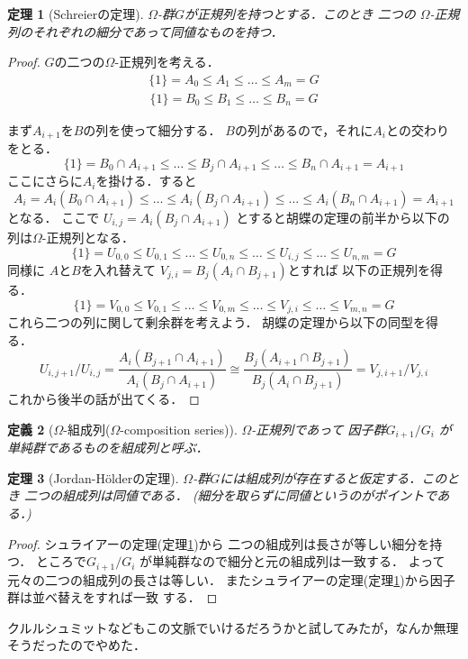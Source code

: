 \documentclass[leqno]{jsarticle}
\newtheorem{thm}{定理}
\newtheorem{df}[thm]{定義}
\begin{document}
\begin{thm}[Schreierの定理]\label{thm:sch}
$\Omega$-群$G$が正規列を持つとする．このとき
二つの
$\Omega$-正規列のそれぞれの細分であって同値なものを持つ．
\end{thm}
\begin{proof}
$G$の二つの$\Omega$-正規列を考える．
\begin{align}\label{al:aseries}
\{1\}=A_{0}\le A_{1}\le \dots \le A_{m}=G
\end{align}
\begin{align}\label{al:bseries}
\{1\}=B_{0}\le B_{1}\le \dots \le B_{n}=G
\end{align}

まず$A_{i+1}$を$B$の列を使って細分する．
$B$の列があるので，それに$A_{i}$との交わりをとる．
\[
\{1\}=B_{0}\cap A_{i+1}\le \dots \le B_{j}\cap A_{i+1}\le \dots \le B_{n}\cap A_{i+1}=A_{i+1}
\]
ここにさらに$A_{i}$を掛ける．すると
\[
A_{i}=A_{i}(B_{0}\cap A_{i+1})\le \dots \le
A_{i}( B_{j}\cap A_{i+1})
\le \dots \le
A_{i}(B_{n}\cap A_{i+1})=A_{i+1}
\]
となる．
ここで
$U_{i, j}=A_{i}(B_{j}\cap A_{i+1})$
とすると胡蝶の定理の前半から以下の列は$\Omega$-正規列となる．
\[
\{1\}=U_{0, 0}\le U_{0, 1}\le \dots\le U_{0, n}\le \dots
\le U_{i, j}\le \dots \le U_{n, m}=G
\]
同様に
$A$と$B$を入れ替えて
$V_{j, i}=B_{j}(A_{i}\cap B_{j+1})$とすれば
以下の正規列を得る．
\[
\{1\}=V_{0, 0}\le V_{0, 1}\le \dots\le V_{0, m}\le \dots
\le V_{j, i}\le \dots \le V_{m, n}=G
\]
これら二つの列に関して剰余群を考えよう．
胡蝶の定理から以下の同型を得る．
\[
U_{i, j+1}/U_{i, j}=\frac{A_{i}(B_{j+1}\cap A_{i+1})}{A_{i}(B_{j}\cap A_{i+1})}\cong 
\frac{B_{j}(A_{i+1}\cap B_{j+1})}{B_{j}(A_{i}\cap B_{j+1})}
=V_{j, i+1}/V_{j, i}
\]
これから後半の話が出てくる．
\end{proof}


\begin{df}[$\Omega$-組成列($\Omega$-composition  series)]
$\Omega$-正規列であって
因子群$G_{i+1}/G_{i}$
が単純群であるものを組成列と呼ぶ．
\end{df}

\begin{thm}[Jordan-H\"olderの定理]\label{thm:jhjh}
$\Omega$-群$G$には組成列が存在すると仮定する．このとき
二つの組成列は同値である．
(細分を取らずに同値というのがポイントである．)
\end{thm}
\begin{proof}
シュライアーの定理(定理\ref{thm:sch})から
二つの組成列は長さが等しい細分を持つ．
ところで$G_{i+1}/G_{i}$
が単純群なので細分と元の組成列は一致する．
よって元々の二つの組成列の長さは等しい．
またシュライアーの定理(定理\ref{thm:sch})から因子群は並べ替えをすれば一致
する．
\end{proof}
クルルシュミットなどもこの文脈でいけるだろうかと試してみたが，なんか無理そうだったのでやめた．
\end{document}
